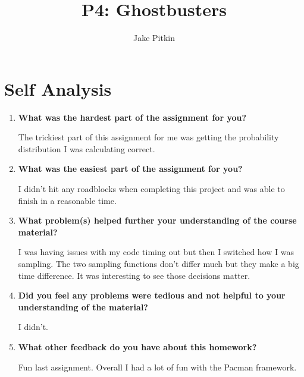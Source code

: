 \documentclass[fleqn]{hw}
\title{P4: Ghostbusters}
\institute{University of Utah}
\author{Jake Pitkin}
\begin{document}
\maketitle

\section*{Self Analysis}

\begin{enumerate}
	\item \textbf{What was the hardest part of the assignment for you?}
	
The trickiest part of this assignment for me was getting the probability distribution I was calculating correct.
	\item \textbf{What was the easiest part of the assignment for you?}
	
I didn't hit any roadblocks when completing this project and was able to finish in a reasonable time.
	\item \textbf{What problem(s) helped further your understanding of the course material?}

I was having issues with my code timing out but then I switched how I was sampling. The two sampling functions don't differ much but they make a big time difference. It was interesting to see those decisions matter.
	\item \textbf{Did you feel any problems were tedious and not helpful to your understanding of the
material?}

I didn't.
	\item \textbf{What other feedback do you have about this homework?}

Fun last assignment. Overall I had a lot of fun with the Pacman framework.
\end{enumerate}
\end{document}
